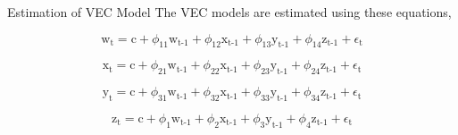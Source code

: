 \documentclass{beamer}
\newcommand{\subTT}[2]{\text{#1}_{\text{#2}}}
\newcommand{\subNT}[2]{#1_{\text{#2}}}
\newcommand{\varGasoline}{w}
\newcommand{\varGasoil}{x}
\newcommand{\varKerosene}{y}
\newcommand{\varLpg}{z}
\begin{document}
	\begin{frame}{Estimation of VEC Model}
		The VEC models are estimated using these equations,
		
		\begin{equation}
			\subTT{\varGasoline}{t} = \text{c} + \subNT{\phi}{11}\subTT{\varGasoline}{t-1} + \subNT{\phi}{12}\subTT{\varGasoil}{t-1} + \subNT{\phi}{13}\subTT{\varKerosene}{t-1} + \subNT{\phi}{14}\subTT{\varLpg}{t-1} + \subNT{\epsilon}{t} 
			\label{model:model_gasoline}
		\end{equation}
		
		\begin{equation}
			\subTT{\varGasoil}{t} = \text{c} + \subNT{\phi}{21}\subTT{\varGasoline}{t-1} + \subNT{\phi}{22}\subTT{\varGasoil}{t-1} + \subNT{\phi}{23}\subTT{\varKerosene}{t-1} + \subNT{\phi}{24}\subTT{\varLpg}{t-1} + \subNT{\epsilon}{t} 
			\label{model:model_gasoil}
		\end{equation}
		
		\begin{equation}
			\subTT{\varKerosene}{t} = \text{c} + \subNT{\phi}{31}\subTT{\varGasoline}{t-1} + \subNT{\phi}{32}\subTT{\varGasoil}{t-1} + \subNT{\phi}{33}\subTT{\varKerosene}{t-1} + \subNT{\phi}{34}\subTT{\varLpg}{t-1} + \subNT{\epsilon}{t} 
			\label{model:model_kerosene}
		\end{equation}
	
		\begin{equation}
			\subTT{\varLpg}{t} = \text{c} + \subNT{\phi}{1}\subTT{\varGasoline}{t-1} + \subNT{\phi}{2}\subTT{\varGasoil}{t-1} + \subNT{\phi}{3}\subTT{\varKerosene}{t-1} + \subNT{\phi}{4}\subTT{\varLpg}{t-1} + \subNT{\epsilon}{t} 
			\label{model:model_lpg}
		\end{equation}
	\end{frame}
\end{document}
